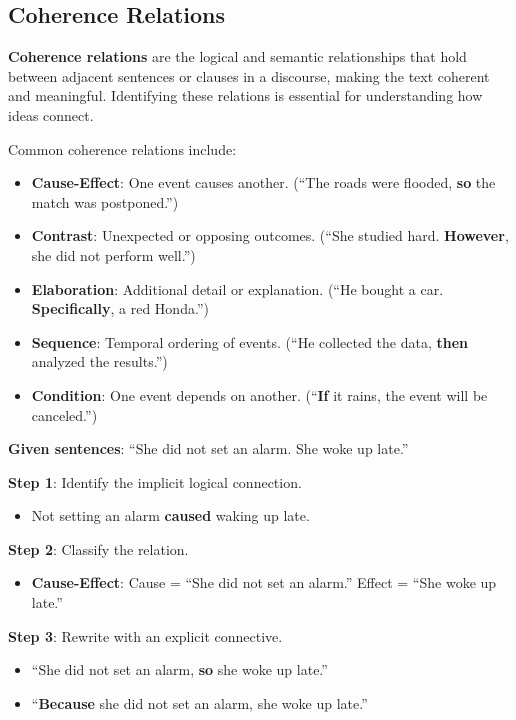 \documentclass[11pt,a4paper]{article}
\begin{document}
\subsection{Coherence Relations}

\textbf{Coherence relations} are the logical and semantic relationships that hold between adjacent sentences or clauses in a discourse, making the text coherent and meaningful. Identifying these relations is essential for understanding how ideas connect.

Common coherence relations include:
\begin{itemize}
    \item \textbf{Cause-Effect}: One event causes another. (``The roads were flooded, \textbf{so} the match was postponed.'')
    \item \textbf{Contrast}: Unexpected or opposing outcomes. (``She studied hard. \textbf{However}, she did not perform well.'')
    \item \textbf{Elaboration}: Additional detail or explanation. (``He bought a car. \textbf{Specifically}, a red Honda.'')
    \item \textbf{Sequence}: Temporal ordering of events. (``He collected the data, \textbf{then} analyzed the results.'')
    \item \textbf{Condition}: One event depends on another. (``\textbf{If} it rains, the event will be canceled.'')
\end{itemize}

\begin{tcolorbox}[colback=green!5!white,colframe=green!75!black,title=\textbf{Worked Example: Identifying Coherence Relations}]
\textbf{Given sentences}: ``She did not set an alarm. She woke up late.''

\textbf{Step 1}: Identify the implicit logical connection.
\begin{itemize}
    \item Not setting an alarm \textbf{caused} waking up late.
\end{itemize}

\textbf{Step 2}: Classify the relation.
\begin{itemize}
    \item \textbf{Cause-Effect}: Cause = ``She did not set an alarm.'' Effect = ``She woke up late.''
\end{itemize}

\textbf{Step 3}: Rewrite with an explicit connective.
\begin{itemize}
    \item ``She did not set an alarm, \textbf{so} she woke up late.''
    \item ``\textbf{Because} she did not set an alarm, she woke up late.''
\end{itemize}
\end{tcolorbox}
\end{document}
